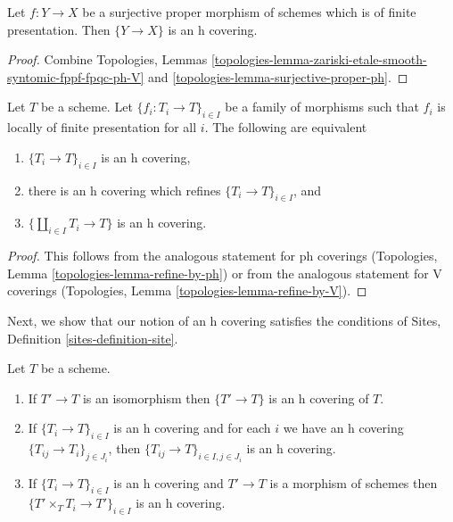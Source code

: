 \begin{lemma}
\label{lemma-surjective-proper-finite-presentation-h}
Let $f : Y \to X$ be a surjective proper morphism of schemes
which is of finite presentation. Then $\{Y \to X\}$ is an h covering.
\end{lemma}

\begin{proof}
Combine Topologies, Lemmas
\ref{topologies-lemma-zariski-etale-smooth-syntomic-fppf-fpqc-ph-V} and
\ref{topologies-lemma-surjective-proper-ph}.
\end{proof}

\begin{lemma}
\label{lemma-refine-by-h}
Let $T$ be a scheme. Let $\{f_i : T_i \to T\}_{i \in I}$ be a family
of morphisms such that $f_i$ is locally of finite presentation for all $i$.
The following are equivalent
\begin{enumerate}
\item $\{T_i \to T\}_{i \in I}$ is an h covering,
\item there is an h covering which refines $\{T_i \to T\}_{i \in I}$, and
\item $\{\coprod_{i \in I} T_i \to T\}$ is an h covering.
\end{enumerate}
\end{lemma}

\begin{proof}
This follows from the analogous statement for ph coverings
(Topologies, Lemma \ref{topologies-lemma-refine-by-ph})
or from the analogous statement for V coverings
(Topologies, Lemma \ref{topologies-lemma-refine-by-V}).
\end{proof}

\noindent
Next, we show that our notion of an h covering satisfies the conditions of
Sites, Definition \ref{sites-definition-site}.

\begin{lemma}
\label{lemma-h}
Let $T$ be a scheme.
\begin{enumerate}
\item If $T' \to T$ is an isomorphism then $\{T' \to T\}$
is an h covering of $T$.
\item If $\{T_i \to T\}_{i\in I}$ is an h covering and for each
$i$ we have an h covering $\{T_{ij} \to T_i\}_{j\in J_i}$, then
$\{T_{ij} \to T\}_{i \in I, j\in J_i}$ is an h covering.
\item If $\{T_i \to T\}_{i\in I}$ is an h covering
and $T' \to T$ is a morphism of schemes then
$\{T' \times_T T_i \to T'\}_{i\in I}$ is an h covering.
\end{enumerate}
\end{lemma}

